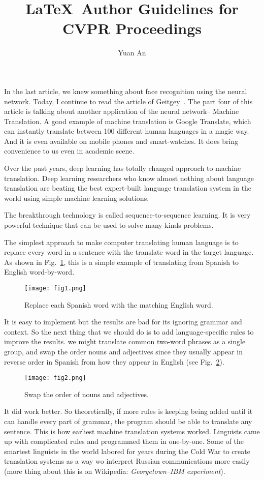 \documentclass[10pt,twocolumn,letterpaper]{article}
\begin{document}
	\title{\LaTeX\ Author Guidelines for CVPR Proceedings}	
	\author{Yuan An}
	\maketitle
	In the last article, we knew something about face recognition using the neural network. Today, I continue to read the article of Geitgey~\cite{MLisFun}. The part four of this article is talking about another application of the neural network-- Machine Translation. A good example of machine translation is Google Translate, which can instantly translate between 100 different human languages in a magic way. And it is even available on mobile phones and smart-watches. It does bring convenience to us even in academic scene.
	\par
	Over the past years, deep learning has totally changed approach to machine translation. Deep learning researchers who know almost nothing about language translation are beating the best expert-built language translation system in the world using simple machine learning solutions.
	\par
	The breakthrough technology is called sequence-to-sequence learning. It is very powerful technique that can be used to solve many kinds problems.
	\par
	The simplest approach to make computer translating human language is to replace every word in a sentence with the translate word in the target language. As shown in  Fig.~\ref{fig1}, this is a simple example of translating from Spanish to English word-by-word.
	\begin{figure}[h]
		\centering
		\texttt{[image: fig1.png]}
		\caption{Replace each Spanish word with the matching English word.} \label{fig1}
	\end{figure}
	\par
	It is easy to implement but the results are bad for its ignoring grammar and context. So the next thing that we should do is to add language-specific rules to improve the results. \Eg we might translate common two-word phrases as a single group, and swap the order nouns and adjectives since they usually appear in reverse order in Spanish from how they appear in English (see Fig.~\ref{fig2}).
	\begin{figure}[h]
		\centering
		\texttt{[image: fig2.png]}
		\caption{Swap the order of nouns and adjectives.} \label{fig2}
	\end{figure}
	\par
	It did work better. So theoretically, if more rules is keeping being added until it can handle every part of grammar, the program should be able to translate any sentence. This is how earliest machine translation systems worked. Linguists came up with complicated rules and programmed them in one-by-one. Some of the smartest linguists in the world labored for years during the Cold War to create translation systems as a way wo interpret Russian communications more easily (more thing about this is on Wikipedia: \emph{Georgetown--IBM experiment}).
\end{document}

